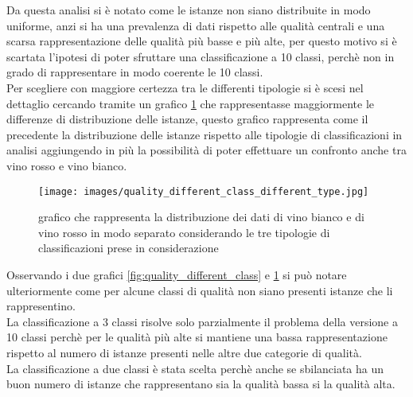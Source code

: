Da questa analisi si è notato come le istanze non siano distribuite in modo uniforme, anzi si ha una prevalenza di dati rispetto alle qualità centrali e una scarsa rappresentazione delle qualità più basse e più alte, per questo motivo si è scartata l'ipotesi di poter sfruttare una classificazione a 10 classi, perchè non in grado di rappresentare in modo coerente le 10 classi.\\
Per scegliere con maggiore certezza tra le differenti tipologie si è scesi nel dettaglio cercando tramite un grafico \ref{fig:quality_different_class_different_class} che rappresentasse maggiormente le differenze di distribuzione delle istanze, questo grafico rappresenta come il precedente la distribuzione delle istanze rispetto alle tipologie di classificazioni in analisi aggiungendo in più la possibilità di poter effettuare un confronto anche tra vino rosso e vino bianco.

\begin{figure}
    \centering
    \texttt{[image: images/quality\_different\_class\_different\_type.jpg]}
    \caption{grafico che rappresenta la distribuzione dei dati di vino bianco e di vino rosso in modo separato considerando le tre tipologie di classificazioni prese in considerazione}
    \label{fig:quality_different_class_different_class}
\end{figure}

\noindent
Osservando i due grafici \ref{fig:quality_different_class} e \ref{fig:quality_different_class_different_class} si può notare ulteriormente come per alcune classi di qualità non siano presenti istanze che li rappresentino.\\
La classificazione a 3 classi risolve solo parzialmente il problema della versione a 10 classi perchè per le qualità più alte si mantiene una bassa rappresentazione rispetto al numero di istanze presenti nelle altre due categorie di qualità.\\
La classificazione a due classi è stata scelta perchè anche se sbilanciata ha un buon numero di istanze che rappresentano sia la qualità bassa si la qualità alta.
